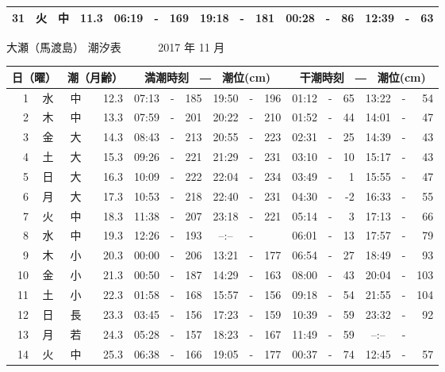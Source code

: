 \documentclass[12pt.a4j]{jsarticle}
\begin{document}
\begin{center}
\begin{table}[ht]
\begin{tabular}{|rc|cr|ccrccr|ccrccr|}
31 & 火 & 中 & 11.3 &  06:19 &-& 169  &  19:18 &-& 181  &   00:28 &-&  86  &   12:39 &-&  63  \\
   \hline
   \end{tabular}
\end{table}
\newpage
 {\LARGE 大瀬（馬渡島）  潮汐表　　　}
 {\large 2017 年 11 月}\\
 \begin{table}[ht]
    \begin{tabular}{|rc|cr|ccrccr|ccrccr|}
    \hline
    \multicolumn{2}{|c|}{日（曜）} & \multicolumn{2}{c|}{潮（月齢）} & \multicolumn{6}{c|}{満潮時刻　―　潮位(cm)} & \multicolumn{6}{c|}{干潮時刻　―　潮位(cm)} \\
 \hline
 1 & 水 & 中 & 12.3 &  07:13 &-& 185  &  19:50 &-& 196  &   01:12 &-&  65  &   13:22 &-&  54  \\
 2 & 木 & 中 & 13.3 &  07:59 &-& 201  &  20:22 &-& 210  &   01:52 &-&  44  &   14:01 &-&  47  \\
 3 & 金 & 大 & 14.3 &  08:43 &-& 213  &  20:55 &-& 223  &   02:31 &-&  25  &   14:39 &-&  43  \\
 4 & 土 & 大 & 15.3 &  09:26 &-& 221  &  21:29 &-& 231  &   03:10 &-&  10  &   15:17 &-&  43  \\
 5 & 日 & 大 & 16.3 &  10:09 &-& 222  &  22:04 &-& 234  &   03:49 &-&   1  &   15:55 &-&  47  \\
 6 & 月 & 大 & 17.3 &  10:53 &-& 218  &  22:40 &-& 231  &   04:30 &-&  -2  &   16:33 &-&  55  \\
 7 & 火 & 中 & 18.3 &  11:38 &-& 207  &  23:18 &-& 221  &   05:14 &-&   3  &   17:13 &-&  66  \\
 8 & 水 & 中 & 19.3 &  12:26 &-& 193  &  --:-- &-&     &   06:01 &-&  13  &   17:57 &-&  79  \\
 9 & 木 & 小 & 20.3 &  00:00 &-& 206  &  13:21 &-& 177  &   06:54 &-&  27  &   18:49 &-&  93  \\
10 & 金 & 小 & 21.3 &  00:50 &-& 187  &  14:29 &-& 163  &   08:00 &-&  43  &   20:04 &-& 103  \\
11 & 土 & 小 & 22.3 &  01:58 &-& 168  &  15:57 &-& 156  &   09:18 &-&  54  &   21:55 &-& 104  \\
12 & 日 & 長 & 23.3 &  03:45 &-& 156  &  17:23 &-& 159  &   10:39 &-&  59  &   23:32 &-&  92  \\
13 & 月 & 若 & 24.3 &  05:28 &-& 157  &  18:23 &-& 167  &   11:49 &-&  59  &   --:-- &-&     \\
14 & 火 & 中 & 25.3 &  06:38 &-& 166  &  19:05 &-& 177  &   00:37 &-&  74  &   12:45 &-&  57  \\

\end{tabular}
\end{table}
\end{center}
\end{document}
